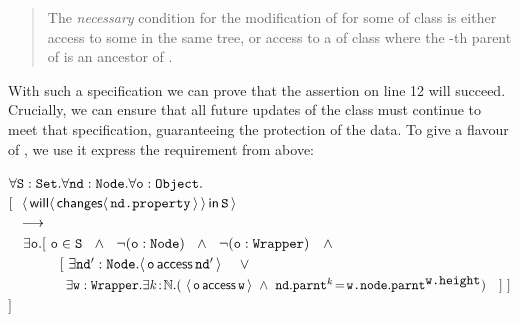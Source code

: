 \begin{quote}
The \emph{necessary} condition for the modification of  for some  of class   is either access to some    in the same tree, or  access to a  of class  where the -th parent of  is an ancestor of .
\end{quote}


With such a specification we can prove that the assertion on line 12
will succeed. Crucially, we can ensure that all future updates of
the  class must continue to meet that specification,
guaranteeing the protection
of the  data. 
%
%
To give a flavour of \Chainmail, we use it  express the requirement from above:
\vspace{.1cm}

\noindent
$\forall {\mbox{\tt{S}}}:{\mbox{\tt{Set}}}.\forall {\mbox{\tt{nd}}}:{\mbox{\tt{Node}}}.\forall {\mbox{\tt{o}}}:{\mbox{\tt{Object}}}.$\\
$[\ \ {\langle\, {\mathsf{will}}\langle \,{\mathsf{changes}}\langle\,{\mbox{\tt{nd.property}}}\,\rangle\,\rangle\, \mathsf{in}\, {\mbox{\tt{S}}}\, \rangle}$ \\
$\strut  \ \ \longrightarrow$\\
$\strut \ \ \ \exists {\mbox{\tt{o}}}.[\ {\mbox{\tt{o}}}\in{\mbox{\tt{S}}}\ \ \wedge\ \ \neg({\mbox{\tt{o}}}:{\mbox{\tt{Node}}})\ \ \wedge\  \ \neg({\mbox{\tt{o}}}:{\mbox{\tt{Wrapper}}})\ \ \ \wedge \  $\\
$ \strut\ \ \  \ \ \ \ \ \ \ \ [\ \exists {\mbox{\tt{nd}}}':{\mbox{\tt{Node}}}. \langle\, {\mbox{\tt{o}}}\, \mathsf{access}\, {\mbox{\tt{nd}}}'\, \rangle\  \ \ \  \vee$\\
$ \strut\ \  \ \  \ \  \ \ \ \ \ \ \ \exists {\mbox{\tt{w}}}:{\mbox{\tt{Wrapper}}}.\exists k\!:\!\mathbb{N}.
  (\ \langle\, {\mbox{\tt{o}}}\, \mathsf{access}\, {\mbox{\tt{w}}}\, \rangle  \ \wedge\ {\mbox{\tt{nd}}}.{\mbox{\tt{parnt}}}^k\!=\!{\mbox{\tt{w.node}}}.{\mbox{\tt{parnt}}}^{{\mbox{\tt{w.height}}}}) \ \ \ ]\ ]$\\
$ ]$

\vspace{.1cm}

